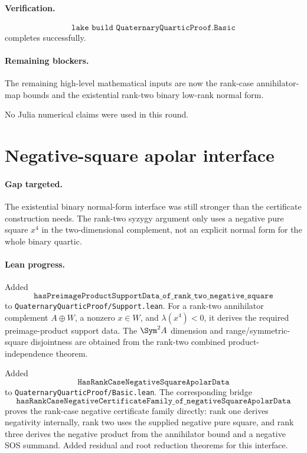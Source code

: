 \documentclass[11pt]{article}
\begin{document}
\paragraph{Verification.}
\[
\texttt{lake build QuaternaryQuarticProof.Basic}
\]
completes successfully.

\paragraph{Remaining blockers.}
The remaining high-level mathematical inputs are now the rank-case
annihilator-map bounds and the existential rank-two binary low-rank normal
form.

No Julia numerical claims were used in this round.

\section*{Negative-square apolar interface}

\paragraph{Gap targeted.}
The existential binary normal-form interface was still stronger than the
certificate construction needs.  The rank-two syzygy argument only uses a
negative pure square \(x^4\) in the two-dimensional complement, not an explicit
normal form for the whole binary quartic.

\paragraph{Lean progress.}
Added
\[
\texttt{hasPreimageProductSupportData\_of\_rank\_two\_negative\_square}
\]
to \texttt{QuaternaryQuarticProof/Support.lean}.  For a rank-two annihilator
complement \(A\oplus W\), a nonzero \(x\in W\), and
\(\lambda(x^4)<0\), it derives the required preimage-product support data.
The \(\Sym^2A\) dimension and range/symmetric-square disjointness are obtained
from the rank-two combined product-independence theorem.

Added
\[
\texttt{HasRankCaseNegativeSquareApolarData}
\]
to \texttt{QuaternaryQuarticProof/Basic.lean}.  The corresponding bridge
\[
\texttt{hasRankCaseNegativeCertificateFamily\_of\_negativeSquareApolarData}
\]
proves the rank-case negative certificate family directly: rank one derives
negativity internally, rank two uses the supplied negative pure square, and
rank three derives the negative product from the annihilator bound and a
negative SOS summand.  Added residual and root reduction theorems for this
interface.
\end{document}
